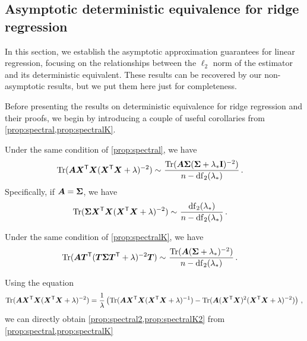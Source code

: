 \subsection{Asymptotic deterministic equivalence for ridge regression}
\label{app:asy_deter_equiv_lr}

In this section, we establish the asymptotic approximation guarantees for linear regression, focusing on the relationships between the $\ell_2$ norm of the estimator and its deterministic equivalent.
These results can be recovered by our non-asymptotic results, but we put them here just for completeness.

Before presenting the results on deterministic equivalence for ridge regression and their proofs, we begin by introducing a couple of useful corollaries from \cref{prop:spectral,prop:spectralK}.

\begin{corollary}
\label{prop:spectral2}
    Under the same condition of \cref{prop:spectral}, we have
    \begin{align}\label{eq:trA3}
        {\rm Tr} ( {\boldsymbol A} {\boldsymbol X}^{\mathsf T} {\boldsymbol X} ( {\boldsymbol X}^{\mathsf T} {\boldsymbol X} + \lambda )^{-2}) \sim&~ \frac{{\rm Tr}({\boldsymbol A}{\boldsymbol \Sigma}({\boldsymbol \Sigma} + \lambda_*{\mathbf I})^{-2})}{n - {\rm df}_2(\lambda_*)}\,.
        \end{align}
        Specifically, if ${\boldsymbol A} = {\boldsymbol \Sigma}$, we have
        \begin{align}\label{eq:trS3}
        {\rm Tr} ( {\boldsymbol \Sigma} {\boldsymbol X}^{\mathsf T} {\boldsymbol X} ( {\boldsymbol X}^{\mathsf T} {\boldsymbol X} + \lambda )^{-2}) \sim&~ \frac{{\rm df}_2(\lambda_*)}{n - {\rm df}_2(\lambda_*)}\,.
    \end{align}
\end{corollary}

\begin{corollary}
\label{prop:spectralK2}
Under the same condition of \cref{prop:spectralK}, we have
\begin{align}
\label{eq:trA3K}
{\rm Tr} ( {\boldsymbol A} {\boldsymbol T}^{\mathsf T} ( {\boldsymbol T} {\boldsymbol \Sigma} {\boldsymbol T}^{\mathsf T} + \lambda )^{-2} {\boldsymbol T}) \sim&~ \frac{{\rm Tr} ( {\boldsymbol A} ( {\boldsymbol \Sigma} + \lambda_* )^{-2})}{ n -  {\rm df}_2(\lambda_*) }\,.
\end{align}
\end{corollary}

Using the equation 
\[
{\rm Tr} ( {\boldsymbol A} {\boldsymbol X}^{\mathsf T} {\boldsymbol X} ( {\boldsymbol X}^{\mathsf T} {\boldsymbol X} + \lambda )^{-2}) = \frac{1}{\lambda} \left( {\rm Tr} ( {\boldsymbol A} {\boldsymbol X}^{\mathsf T} {\boldsymbol X} ( {\boldsymbol X}^{\mathsf T} {\boldsymbol X} + \lambda )^{-1}) - {\rm Tr} ( {\boldsymbol A} ({\boldsymbol X}^{\mathsf T} {\boldsymbol X})^2 ( {\boldsymbol X}^{\mathsf T} {\boldsymbol X} + \lambda )^{-2}) \right)\,,
\] 
we can directly obtain \cref{prop:spectral2,prop:spectralK2} from \cref{prop:spectral,prop:spectralK}

